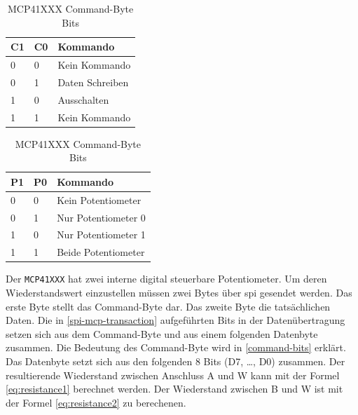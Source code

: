 \begin{table}
    \centering
    \begin{subtable}[t]{5cm}
        \centering
        \begin{tabular}{|l|l|l|}
            \hline
            \textbf{C1} & \textbf{C0} & \textbf{Kommando} \\
            \hline
            \hline
            0 & 0 & Kein Kommando \\
            \hline
            0 & 1 & Daten Schreiben \\
            \hline
            1 & 0 & Ausschalten \\
            \hline
            1 & 1 & Kein Kommando \\
            \hline
        \end{tabular}
        \caption{Kommando Bits}\label{command:1a}
    \end{subtable}
    \quad
    \begin{subtable}[t]{5cm}
        \centering
        \begin{tabular}{|l|l|l|}
            \hline
            \textbf{P1} & \textbf{P0} & \textbf{Kommando} \\
            \hline
            \hline
            0 & 0 & Kein Potentiometer \\
            \hline
            0 & 1 & Nur Potentiometer 0 \\
            \hline
            1 & 0 & Nur Potentiometer 1 \\
            \hline
            1 & 1 & Beide Potentiometer \\
            \hline
        \end{tabular}
        \caption{Potentiometer bits}\label{command:1b}
    \end{subtable}
    \caption{MCP41XXX Command-Byte Bits}
    \label{command-bits}
\end{table}

Der \texttt{MCP41XXX} hat zwei interne digital steuerbare Potentiometer.
Um deren Wiederstandswert einzustellen müssen zwei Bytes über \gls{spi} gesendet werden.
Das erste Byte stellt das Command-Byte dar.
Das zweite Byte die tatsächlichen Daten.
Die in \autoref{spi-mcp-transaction} aufgeführten Bits in der Datenübertragung setzen sich aus dem Command-Byte und aus einem folgenden Datenbyte zusammen.
Die Bedeutung des Command-Byte wird in \autoref{command-bits} erklärt.
Das Datenbyte setzt sich aus den folgenden 8 Bits (D7, \ldots, D0) zusammen.
Der resultierende Wiederstand zwischen Anschluss A und W kann mit der Formel \autoref{eq:resistance1} berechnet werden.
Der Wiederstand zwischen B und W ist mit der Formel \autoref{eq:resistance2} zu berechenen.

